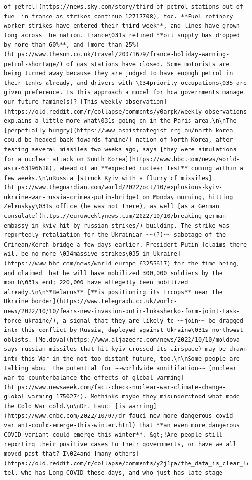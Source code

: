 \documentclass[
  letterpaper,
  DIV=11,
  numbers=noendperiod]{scrreprt}
\begin{document}
\begin{verbatim}
of petrol](https://news.sky.com/story/third-of-petrol-stations-out-of-fuel-in-france-as-strikes-continue-12717708), too. **Fuel refinery worker strikes have entered their third week**, and lines have grown long across the nation. France\031s refined **oil supply has dropped by more than 60%**, and [more than 25%](https://www.thesun.co.uk/travel/20071679/france-holiday-warning-petrol-shortage/) of gas stations have closed. Some motorists are being turned away because they are judged to have enough petrol in their tanks already, and drivers with \034priority occupations\035 are given preference. Is this approach a model for how governments manage our future famine(s)? [This weekly observation](https://old.reddit.com/r/collapse/comments/y0arpk/weekly_observations_what_signs_of_collapse_do_you/is2wqoy/) explains a little more what\031s going on in the Paris area.\n\nThe [perpetually hungry](https://www.aspistrategist.org.au/north-korea-could-be-headed-back-towards-famine/) nation of North Korea, after testing several missiles two weeks ago, says [they were simulations for a nuclear attack on South Korea](https://www.bbc.com/news/world-asia-63196618), ahead of an **expected nuclear test** coming within a few weeks.\n\nRussia [struck Kyiv with a flurry of missiles](https://www.theguardian.com/world/2022/oct/10/explosions-kyiv-ukraine-war-russia-crimea-putin-bridge) on Monday morning, hitting Zelenskyy\031s office (he was not there), as well [as a German consulate](https://euroweeklynews.com/2022/10/10/breaking-german-embassy-in-kyiv-hit-by-russian-strikes/) building. The strike was reportedly retaliation for the Ukrainian ~~(?)~~ sabotage of the Crimean/Kerch bridge a few days earlier. President Putin [claims there will be no more \034massive strikes\035 in Ukraine](https://www.bbc.com/news/world-europe-63255617) for the time being, and claimed that he will have mobilized 300,000 soldiers by the month\031s end; 220,000 have allegedly been mobilized already.\n\n**Belarus** [**is positioning its troops** near the Ukraine border](https://www.telegraph.co.uk/world-news/2022/10/10/fears-new-invasion-putin-lukashenko-form-joint-task-force-ukraine/), a signal that they are likely to ~~join~~ be dragged into this conflict by Russia, deployed against Ukraine\031s northwest oblasts. [Moldova](https://www.aljazeera.com/news/2022/10/10/moldova-says-russian-missiles-that-hit-kyiv-crossed-its-airspace) may be drawn into this War in the not-too-distant future, too.\n\nSome people are talking about the potential for ~~worldwide annihilation~~ [nuclear war to counterbalance the effects of global warming](https://www.newsweek.com/fact-check-nuclear-war-climate-change-global-warming-1750274). Methinks maybe they misunderstood what made the Cold War cold.\n\nDr. Fauci [is warning](https://www.cnbc.com/2022/10/07/dr-fauci-new-more-dangerous-covid-variant-could-emerge-this-winter.html) that **an even more dangerous COVID variant could emerge this winter**. &gt;!Are people still reporting their positive cases to their governments, or have we all moved past that? I\024and [many others](https://old.reddit.com/r/collapse/comments/y2j1pa/the_data_is_clear_long_covid_is_devastating/is3ws1h/)\024can\031t tell who has Long COVID these days, and who just has late-stage 
\end{verbatim}
\end{document}
